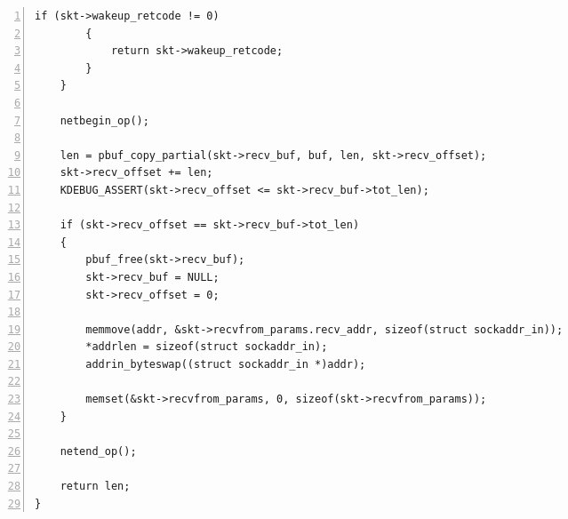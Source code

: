 \documentclass[a4paper,twoside]{ctexrep}
\begin{document}
\begin{spacing}{1.2}
\begin{lstlisting}[numbers=left,style=CppStyle,caption=Socket API的顶层封装,label={code:sockrecvfrom}]
		if (skt->wakeup_retcode != 0)
		{
			return skt->wakeup_retcode;
		}
	}

	netbegin_op();

	len = pbuf_copy_partial(skt->recv_buf, buf, len, skt->recv_offset);
	skt->recv_offset += len;
	KDEBUG_ASSERT(skt->recv_offset <= skt->recv_buf->tot_len);

	if (skt->recv_offset == skt->recv_buf->tot_len)
	{
		pbuf_free(skt->recv_buf);
		skt->recv_buf = NULL;
		skt->recv_offset = 0;

		memmove(addr, &skt->recvfrom_params.recv_addr, sizeof(struct sockaddr_in));
		*addrlen = sizeof(struct sockaddr_in);
		addrin_byteswap((struct sockaddr_in *)addr);

		memset(&skt->recvfrom_params, 0, sizeof(skt->recvfrom_params));
	}

	netend_op();

	return len;
}
\end{lstlisting}


\end{spacing}
\end{document}
